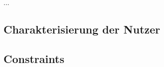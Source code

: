 \documentclass[12pt]{article} %
\begin{document}
...

\subsection{Charakterisierung der Nutzer}







\subsection{Constraints}
\end{document}
